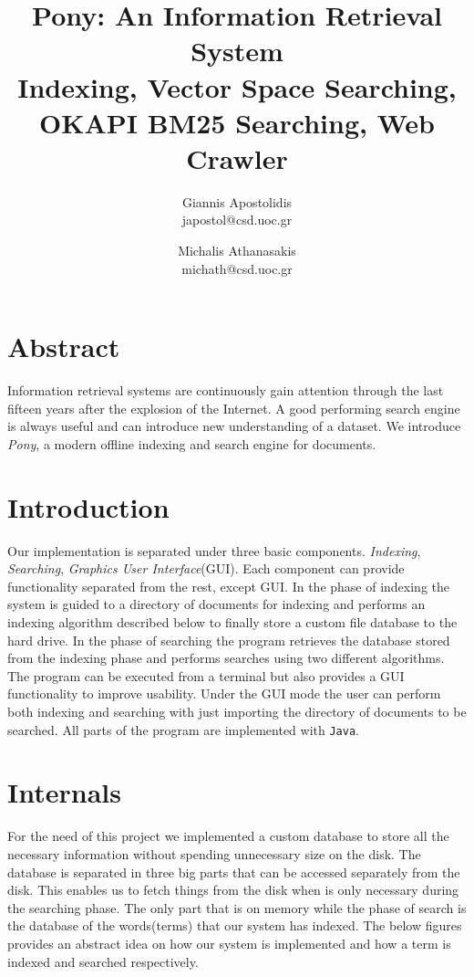 \documentclass[letterpaper,twocolumn,10pt]{article}
\begin{document}
\date{}

\title{\Large Pony: An Information Retrieval System \\ \small Indexing, Vector Space Searching, OKAPI BM25 Searching, Web Crawler}


\author{{\rm Giannis Apostolidis}\\
				{\rm japostol@csd.uoc.gr}\\
				\and
				{\rm Michalis Athanasakis}\\
				{\rm michath@csd.uoc.gr}\\
}
\maketitle
\section{Abstract}
Information retrieval systems are continuously gain attention through the last fifteen years after the explosion of the Internet. A good performing search engine is always useful and can introduce new understanding of a dataset. We introduce \emph{ Pony}, a modern offline indexing and search engine for documents.

\section{Introduction}
Our implementation is separated under three basic components.\emph{ Indexing}, \emph{ Searching}, \emph{ Graphics User Interface}(GUI). Each component can provide functionality separated from the rest, except GUI. In the phase of indexing the system is guided to a directory of documents for indexing and performs an indexing algorithm described below to finally store a custom file database to the hard drive. In the phase of searching the program retrieves the database stored from the indexing phase and performs searches using two different algorithms. The program can be executed from a terminal but also provides a GUI functionality to improve usability. Under the GUI mode the user can perform both indexing and searching with just importing the directory of documents to be searched. All parts of the program are implemented with {\tt Java}.

\section{Internals}
For the need of this project we implemented a custom database to store all the necessary information without spending unnecessary size on the disk. The database is separated in three big parts that can be accessed separately from the disk. This enables us to fetch things from the disk when is only necessary during the searching phase. The only part that is on memory while the phase of search is the database of the words(terms) that our system has indexed. The below figures provides an abstract idea on how our system is implemented and how a term is indexed and searched respectively.
\end{document}
